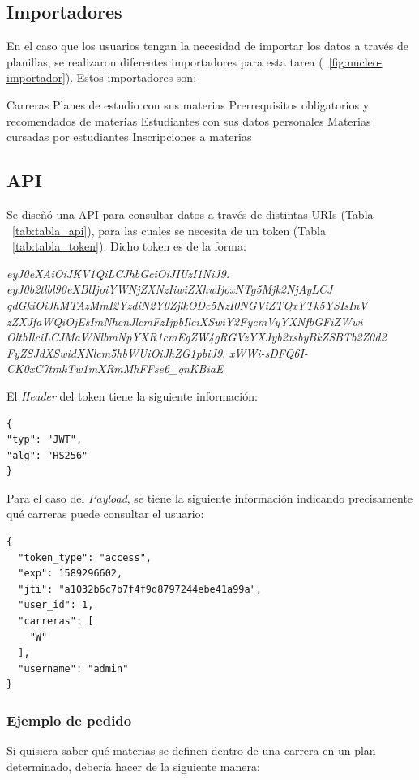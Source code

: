 \subsection{Importadores}

En el caso que los usuarios tengan la necesidad de importar los datos a través de planillas, se realizaron diferentes importadores para esta tarea (~\ref{fig:nucleo-importador}).
Estos importadores son:
\begin{outline}
\2 Carreras
\2 Planes de estudio con sus materias
\2 Prerrequisitos obligatorios y recomendados de materias
\2 Estudiantes con sus datos personales
\2 Materias cursadas por estudiantes
\2 Inscripciones a materias
\end{outline}

\subsection{API}

Se diseñó una API para consultar datos a través de distintas URIs (Tabla ~\ref{tab:tabla_api}), para las cuales se necesita de un token (Tabla ~\ref{tab:tabla_token}).
Dicho token es de la forma:

\textit{eyJ0eXAiOiJKV1QiLCJhbGciOiJIUzI1NiJ9.} \break 
\textit{eyJ0b2tlbl90eXBlIjoiYWNjZXNzIiwiZXhwIjoxNTg5Mjk2NjAyLCJ}\break 
\textit{qdGkiOiJhMTAzMmI2YzdiN2Y0ZjlkODc5NzI0NGViZTQxYTk5YSIsInV}\break 
\textit{zZXJfaWQiOjEsImNhcnJlcmFzIjpbIlciXSwiY2FycmVyYXNfbGFiZWwi} \break \textit{OltbIlciLCJMaWNlbmNpYXR1cmEgZW4gRGVzYXJyb2xsbyBkZSBTb2Z0d2}\break 
\textit{FyZSJdXSwidXNlcm5hbWUiOiJhZG1pbiJ9}.\break 
\textit{xWWi-sDFQ6I-CK0xC7tmkTw1mXRmMhFFse6\_qnKBiaE}

\break
El \textit{Header} del token tiene la siguiente información:
\begin{verbatim}
{
"typ": "JWT",
"alg": "HS256"
}
\end{verbatim}
\break
Para el caso del \textit{Payload}, se tiene la siguiente información indicando precisamente qué carreras puede consultar el usuario:
\begin{verbatim}
{
  "token_type": "access",
  "exp": 1589296602,
  "jti": "a1032b6c7b7f4f9d8797244ebe41a99a",
  "user_id": 1,
  "carreras": [
    "W"
  ],
  "username": "admin"
}
\end{verbatim}

\subsubsection{Ejemplo de pedido}
Si quisiera saber qué materias se definen dentro de una carrera en un plan determinado, debería hacer de la siguiente manera:

